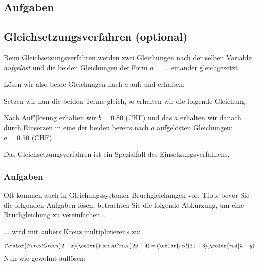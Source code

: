 \subsection*{Aufgaben}

\newpage


\subsection{Gleichsetzungsverfahren (optional)}\label{lin_gl_gleichsetzungsverfahren}
Beim Gleichsetzungsverfahren werden zwei Gleichungen nach der selben Variable \textit{aufgelöst} und die beiden Gleichungen der Form $a = ...$ einander gleichgesetzt.

Lösen wir also beide Gleichungen nach $a$ auf:
und erhalten:



Setzen wir nun die beiden Terme gleich, so erhalten wir die
folgende Gleichung:


Nach Auf"|lösung erhalten wir $b=0.80$ (CHF) und das $a$ erhalten wir danach durch Einsetzen in eine der beiden bereits nach $a$ aufgelösten Gleichungen: $a=0.50$ (CHF).

Das Gleichsetzungsverfahren ist ein Spezialfall des
Einsetzungsverfahrens.
\newpage


\subsubsection*{Aufgaben}
Oft kommen auch in Gleichungssystemen Bruchgleichungen vor. Tipp:
bevor Sie die folgenden Aufgaben lösen, betrachten Sie die folgende
Abkürzung, um eine Bruchgleichung zu vereinfachen...

... wird mit «übers Kreuz multiplizieren» zu:

$$({\color{ForestGreen}2-x})({\color{ForestGreen}2y-4}) =
({\color{red}2x-3})({\color{red}5-y})$$
Nun wie gewohnt auflösen:

